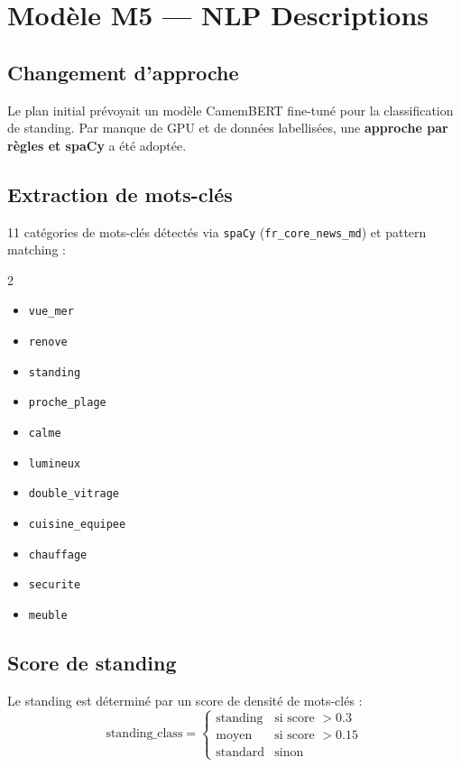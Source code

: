 \documentclass[12pt,a4paper]{report}
\begin{document}
\section{Modèle M5 — NLP Descriptions}

\subsection{Changement d'approche}
Le plan initial prévoyait un modèle CamemBERT fine-tuné pour la classification de standing. Par manque de GPU et de données labellisées, une \textbf{approche par règles et spaCy} a été adoptée.

\subsection{Extraction de mots-clés}
11 catégories de mots-clés détectés via \texttt{spaCy} (\texttt{fr\_core\_news\_md}) et pattern matching :

\begin{multicols}{2}
\begin{itemize}
    \item \texttt{vue\_mer}
    \item \texttt{renove}
    \item \texttt{standing}
    \item \texttt{proche\_plage}
    \item \texttt{calme}
    \item \texttt{lumineux}
    \item \texttt{double\_vitrage}
    \item \texttt{cuisine\_equipee}
    \item \texttt{chauffage}
    \item \texttt{securite}
    \item \texttt{meuble}
\end{itemize}
\end{multicols}

\subsection{Score de standing}
Le standing est déterminé par un score de densité de mots-clés :
\[
\text{standing\_class} = 
\begin{cases}
\text{standing} & \text{si score } > 0.3 \\
\text{moyen} & \text{si score } > 0.15 \\
\text{standard} & \text{sinon}
\end{cases}
\]
\end{document}
